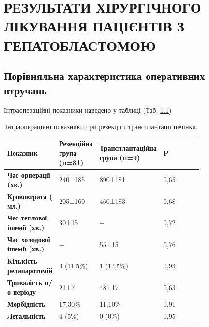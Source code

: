 \chapter{РЕЗУЛЬТАТИ ХІРУРГІЧНОГО ЛІКУВАННЯ ПАЦІЄНТІВ З ГЕПАТОБЛАСТОМОЮ}

\section{Порівняльна характеристика оперативних втручань}

Інтраопераційні показники наведено у таблиці (Таб. \ref{tab:operdani})


\begin{table}[]
\centering
\caption{Інтраопераційні показники при резекції і трансплантації печінки.}
\label{tab:operdani}
\begin{tabular}{|p{0.2\linewidth}|
                 p{0.2\linewidth}|
                 p{0.2\linewidth}|
                 p{0.2\linewidth}|}
\hline
{\color[HTML]{231F20} \textbf{Показник}} &
  {\color[HTML]{231F20} \textbf{Резекційна група (n=81)}} &
  {\color[HTML]{231F20} \textbf{Транс\-план\-тацій\-на група (n=9)}} &
  {\color[HTML]{231F20} \textbf{P}} \\ \hline
{\color[HTML]{231F20} \textbf{Час орперації (хв.)}}        & {\color[HTML]{231F20} 240±185} & {\color[HTML]{231F20} 890±181} & {\color[HTML]{231F20} 0,65} \\ \hline
{\color[HTML]{231F20} \textbf{Крововтрата ( мл.)}}         & {\color[HTML]{231F20} 205±160} & {\color[HTML]{231F20} 460±183} & {\color[HTML]{231F20} 0,68} \\ \hline
{\color[HTML]{231F20} \textbf{Чес теплової ішемії (хв.)}}  & {\color[HTML]{231F20} 30±15}   & {\color[HTML]{231F20} −}       & {\color[HTML]{231F20} 0,72} \\ \hline
{\color[HTML]{231F20} \textbf{Час холодової ішемії (хв.)}} & {\color[HTML]{231F20} −}       & {\color[HTML]{231F20} 55±15}   & {\color[HTML]{231F20} 0,76} \\ \hline
{\color[HTML]{231F20} \textbf{Кількість релапаротомій}} &
  {\color[HTML]{231F20} 6 (11,5\%)} &
  {\color[HTML]{231F20} 1 (12,5\%)} &
  {\color[HTML]{231F20} 0,93} \\ \hline
{\color[HTML]{231F20} \textbf{Тривалість п/о періоду}}     & {\color[HTML]{231F20} 21±7}    & {\color[HTML]{231F20} 48±17}   & {\color[HTML]{231F20} 0,63} \\ \hline
{\color[HTML]{231F20} \textbf{Морбідність}}                & {\color[HTML]{231F20} 17,30\%} & {\color[HTML]{231F20} 11,10\%} & {\color[HTML]{231F20} 0,91} \\ \hline
{\color[HTML]{231F20} \textbf{Летальність}}                & {\color[HTML]{231F20} 4 (5\%)} & {\color[HTML]{231F20} 0 (0\%)} & {\color[HTML]{231F20} 0,95} \\ \hline
\end{tabular}
\end{table}

